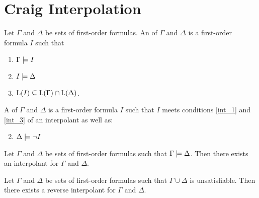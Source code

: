 \section{Craig Interpolation}


\begin{defi}
	\label{def:interpolant}
	Let $\Gamma$ and $\Delta$ be sets of first-order formulas.
	An  of $\Gamma$ and $\Delta$ is a first-order formula $I$ such that 
	\begin{enumerate}
		\item $ \Gamma \models I$ \label{int_1}
		\item $ I \models \Delta $  \label{int_2}
		\item $ \operatorname{L}(I) \subseteq \operatorname{L}(\Gamma) \cap \operatorname{L}(\Delta)$.  \label{int_3}
	\end{enumerate}

	\begin{samepage}
		A  of $\Gamma$ and $\Delta$ is a first-order formula $I$ such that $I$ meets conditions \ref{int_1} and \ref{int_3} of an interpolant as well as:
		\begin{enumerate}[\quad\:1'.]
				\setcounter{enumi}{1}
			\item $ \Delta \models \lnot I $  \label{int_2prime}
				\qedhere
		\end{enumerate}
	\end{samepage}
\end{defi}

\begin{thm}[Interpolation]
	\label{thm:interpolation_original}
	Let $\Gamma$ and $\Delta$ be sets of first-order formulas such that $ \Gamma \models \Delta $.
	Then there exists an interpolant for $\Gamma$ and $\Delta$.
\end{thm}

\begin{thm}
	\label{thm:interpolation}
	Let $\Gamma$ and $\Delta$ be sets of first-order formulas such that $ \Gamma \cup \Delta $ is unsatisfiable.
	Then there exists a reverse interpolant for $\Gamma$ and $\Delta$.
\end{thm}


